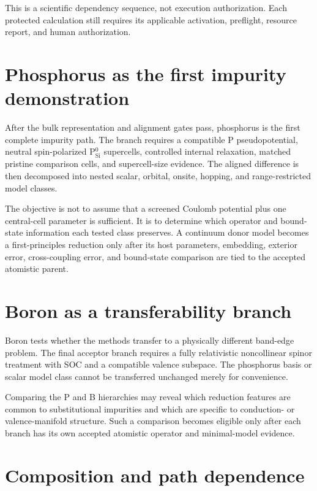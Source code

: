 This is a scientific dependency sequence, not execution authorization. Each
protected calculation still requires its applicable activation, preflight,
resource report, and human authorization.

\section{Phosphorus as the first impurity demonstration}

After the bulk representation and alignment gates pass, phosphorus is the first
complete impurity path. The branch requires a compatible P pseudopotential,
neutral spin-polarized P$_\mathrm{Si}^{0}$ supercells, controlled internal
relaxation, matched pristine comparison cells, and supercell-size evidence. The
aligned difference is then decomposed into nested scalar, orbital, onsite,
hopping, and range-restricted model classes.

The objective is not to assume that a screened Coulomb potential plus one
central-cell parameter is sufficient. It is to determine which operator and
bound-state information each tested class preserves. A continuum donor model
becomes a first-principles reduction only after its host parameters, embedding,
exterior error, cross-coupling error, and bound-state comparison are tied to the
accepted atomistic parent.

\section{Boron as a transferability branch}

Boron tests whether the methods transfer to a physically different band-edge
problem. The final acceptor branch requires a fully relativistic noncollinear
spinor treatment with SOC and a compatible valence subspace. The phosphorus
basis or scalar model class cannot be transferred unchanged merely for
convenience.

Comparing the P and B hierarchies may reveal which reduction features are common
to substitutional impurities and which are specific to conduction- or
valence-manifold structure. Such a comparison becomes eligible only after each
branch has its own accepted atomistic operator and minimal-model evidence.

\section{Composition and path dependence}

